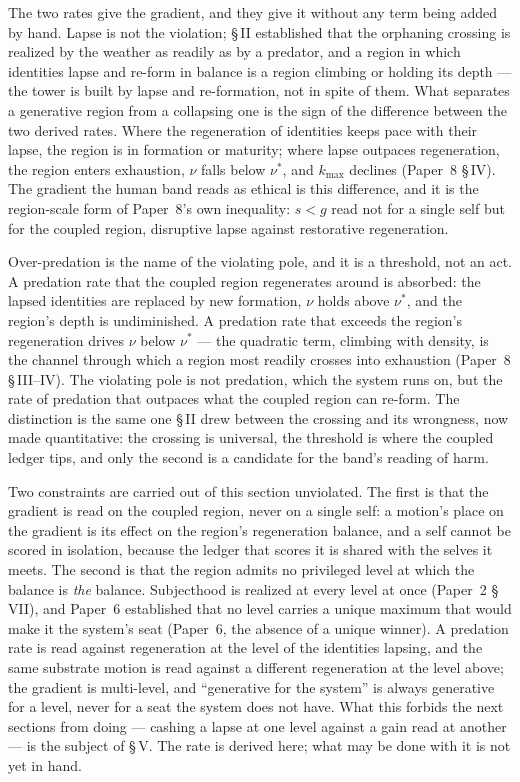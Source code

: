 \documentclass[11pt,oneside]{report}
\theoremstyle{definition}
\theoremstyle{remark}
\begin{document}
The two rates give the gradient, and they give it without any term being added by hand. Lapse is not the violation; \S\,II established that the orphaning crossing is realized by the weather as readily as by a predator, and a region in which identities lapse and re-form in balance is a region climbing or holding its depth --- the tower is built by lapse and re-formation, not in spite of them. What separates a generative region from a collapsing one is the sign of the difference between the two derived rates. Where the regeneration of identities keeps pace with their lapse, the region is in formation or maturity; where lapse outpaces regeneration, the region enters exhaustion, \ensuremath{\nu} falls below \ensuremath{\nu^*}, and \ensuremath{k_{\max}} declines (Paper~8 \S\,IV). The gradient the human band reads as ethical is this difference, and it is the region-scale form of Paper~8's own inequality: \ensuremath{s < g} read not for a single self but for the coupled region, disruptive lapse against restorative regeneration.

Over-predation is the name of the violating pole, and it is a threshold, not an act. A predation rate that the coupled region regenerates around is absorbed: the lapsed identities are replaced by new formation, \ensuremath{\nu} holds above \ensuremath{\nu^*}, and the region's depth is undiminished. A predation rate that exceeds the region's regeneration drives \ensuremath{\nu} below \ensuremath{\nu^*} --- the quadratic term, climbing with density, is the channel through which a region most readily crosses into exhaustion (Paper~8 \S\,III--IV). The violating pole is not predation, which the system runs on, but the rate of predation that outpaces what the coupled region can re-form. The distinction is the same one \S\,II drew between the crossing and its wrongness, now made quantitative: the crossing is universal, the threshold is where the coupled ledger tips, and only the second is a candidate for the band's reading of harm.

Two constraints are carried out of this section unviolated. The first is that the gradient is read on the coupled region, never on a single self: a motion's place on the gradient is its effect on the region's regeneration balance, and a self cannot be scored in isolation, because the ledger that scores it is shared with the selves it meets. The second is that the region admits no privileged level at which the balance is \emph{the} balance. Subjecthood is realized at every level at once (Paper~2 \S\,VII), and Paper~6 established that no level carries a unique maximum that would make it the system's seat (Paper~6, the absence of a unique winner). A predation rate is read against regeneration at the level of the identities lapsing, and the same substrate motion is read against a different regeneration at the level above; the gradient is multi-level, and ``generative for the system'' is always generative for a level, never for a seat the system does not have. What this forbids the next sections from doing --- cashing a lapse at one level against a gain read at another --- is the subject of \S\,V. The rate is derived here; what may be done with it is not yet in hand.
\end{document}
